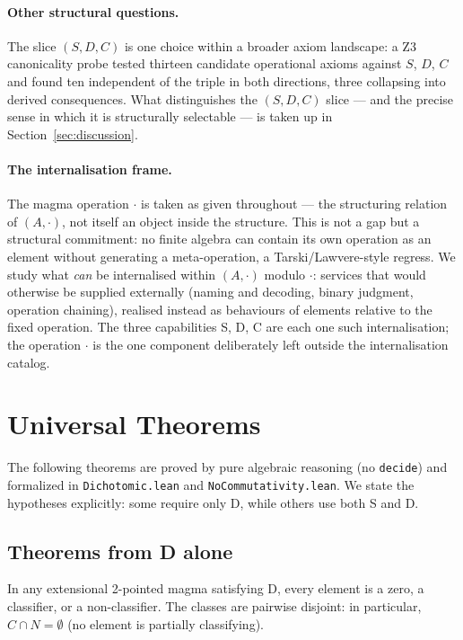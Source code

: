 \documentclass[sigconf,screen]{acmart}
\newcommand{\dotop}{\cdot}
\theoremstyle{remark}
\begin{document}
\paragraph{Other structural questions.} The slice $(S, D, C)$ is one
choice within a broader axiom landscape: a Z3 canonicality probe tested
thirteen candidate operational axioms against $S$, $D$, $C$ and found
ten independent of the triple in both directions, three collapsing into
derived consequences. What distinguishes the $(S, D, C)$ slice --- and
the precise sense in which it is structurally selectable --- is taken up
in Section~\ref{sec:discussion}.

\paragraph{The internalisation frame.}
The magma operation $\dotop$ is taken as given throughout --- the
structuring relation of $(A, \dotop)$, not itself an object inside the
structure. This is not a gap but a structural commitment: no finite
algebra can contain its own operation as an element without generating
a meta-operation, a Tarski/Lawvere-style regress. We study what
\emph{can} be internalised within $(A, \dotop)$ modulo $\dotop$:
services that would otherwise be supplied externally (naming and
decoding, binary judgment, operation chaining), realised instead as
behaviours of elements relative to the fixed operation. The three
capabilities S, D, C are each one such internalisation; the operation
$\dotop$ is the one component deliberately left outside the
internalisation catalog.

\section{Universal Theorems}
\label{sec:universal}

The following theorems are proved by pure algebraic reasoning (no \texttt{decide}) and formalized in \texttt{Dichotomic.lean} and \texttt{NoCommutativity.lean}. We state the hypotheses explicitly: some require only D, while others use both S and D.

\subsection{Theorems from D alone}

\begin{theorem}
\label{thm:three-cat}
In any extensional 2-pointed magma satisfying D, every element is a zero, a classifier, or a non-classifier. The classes are pairwise disjoint: in particular, $C \cap N = \emptyset$ (no element is partially classifying).
\end{theorem}
\end{document}
